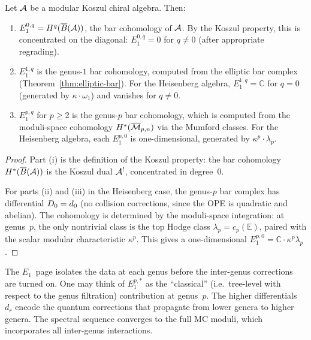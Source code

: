 \begin{proposition}
\label{prop:thqg-VII-E1-koszul}
Let $\mathcal{A}$ be a modular Koszul chiral algebra. Then:
\begin{enumerate}[label=\textup{(\roman*)}]
\item $E_1^{0,q} = H^q(\overline{B}(\mathcal{A}))$, the bar cohomology of
 $\mathcal{A}$. By the Koszul property, this is concentrated on the
 diagonal: $E_1^{0,q} = 0$ for $q \neq 0$ (after appropriate
 regrading).
\item $E_1^{1,q}$ is the genus-$1$ bar cohomology, computed
 from the elliptic bar complex
 (Theorem~\ref{thm:elliptic-bar}). For the Heisenberg
 algebra, $E_1^{1,q} = \mathbb{C}$ for $q = 0$ (generated by
 $\kappa \cdot \omega_1$) and vanishes for $q \neq 0$.
\item $E_1^{p,q}$ for $p \geq 2$ is the genus-$p$ bar
 cohomology, which is computed from the moduli-space
 cohomology $H^*(\overline{\mathcal{M}}_{p,n})$ via the Mumford
 classes. For the Heisenberg algebra, each $E_1^{p,0}$ is
 one-dimensional, generated by $\kappa^p \cdot \lambda_p$.
\end{enumerate}
\end{proposition}

\begin{proof}
Part (i) is the definition of the Koszul property: the bar
cohomology $H^*(\overline{B}(\mathcal{A}))$ is the Koszul dual $\mathcal{A}^!$,
concentrated in degree~$0$.

For parts (ii) and (iii) in the Heisenberg case, the genus-$p$
bar complex has differential $D_0 = d_0$ (no collision
corrections, since the OPE is quadratic and abelian). The
cohomology is determined by the moduli-space integration:
at genus~$p$, the only nontrivial class is the top Hodge class
$\lambda_p = c_p(\mathbb{E})$, paired with the scalar modular
characteristic $\kappa^p$. This gives a one-dimensional
$E_1^{p,0} = \mathbb{C} \cdot \kappa^p \lambda_p$.
\end{proof}

\begin{remark}
\label{rem:thqg-VII-E1-classical}
The $E_1$~page isolates the data at each genus before the
inter-genus corrections are turned on. One may think of
$E_1^{p,*}$ as the ``classical'' (i.e.\ tree-level with respect
to the genus filtration) contribution at genus~$p$. The
higher differentials $d_r$ encode the quantum corrections that
propagate from lower genera to higher genera. The spectral
sequence converges to the full MC moduli, which incorporates
all inter-genus interactions.
\end{remark}

